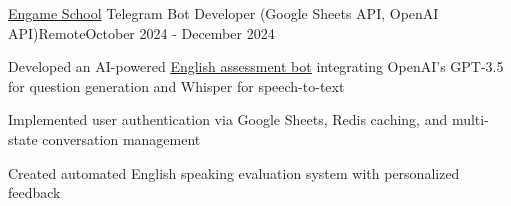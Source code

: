 \begin{resume_employer}{\href{https://engame.uz/}{Engame School}} {Telegram Bot Developer (Google Sheets API, OpenAI API)}{Remote}{October 2024 - December 2024}
  \item Developed an AI-powered \href{https://t.me/engamefridaybot}{English assessment bot} integrating OpenAI's GPT-3.5 for question generation and Whisper for speech-to-text
  \item Implemented user authentication via Google Sheets, Redis caching, and multi-state conversation management
  \item Created automated English speaking evaluation system with personalized feedback
\end{resume_employer}

